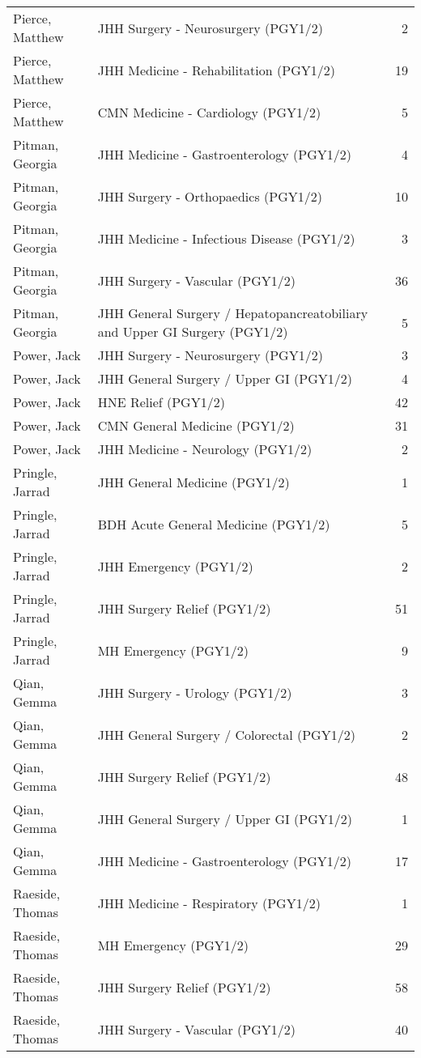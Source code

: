 \documentclass[
]{article}
\begin{document}
\begin{longtable}{llr}
Pierce, Matthew & JHH Surgery - Neurosurgery (PGY1/2) & 2 \\ 
Pierce, Matthew & JHH Medicine - Rehabilitation (PGY1/2) & 19 \\ 
Pierce, Matthew & CMN Medicine - Cardiology (PGY1/2) & 5 \\ 
Pitman, Georgia & JHH Medicine - Gastroenterology (PGY1/2) & 4 \\ 
Pitman, Georgia & JHH Surgery - Orthopaedics (PGY1/2) & 10 \\ 
Pitman, Georgia & JHH Medicine - Infectious Disease (PGY1/2) & 3 \\ 
Pitman, Georgia & JHH Surgery - Vascular (PGY1/2) & 36 \\ 
Pitman, Georgia & JHH General Surgery / Hepatopancreatobiliary and Upper GI Surgery (PGY1/2) & 5 \\ 
Power, Jack & JHH Surgery - Neurosurgery (PGY1/2) & 3 \\ 
Power, Jack & JHH General Surgery / Upper GI (PGY1/2) & 4 \\ 
Power, Jack & HNE Relief (PGY1/2) & 42 \\ 
Power, Jack & CMN General Medicine (PGY1/2) & 31 \\ 
Power, Jack & JHH Medicine - Neurology (PGY1/2) & 2 \\ 
Pringle, Jarrad & JHH General Medicine (PGY1/2) & 1 \\ 
Pringle, Jarrad & BDH Acute General Medicine (PGY1/2) & 5 \\ 
Pringle, Jarrad & JHH Emergency (PGY1/2) & 2 \\ 
Pringle, Jarrad & JHH Surgery Relief (PGY1/2) & 51 \\ 
Pringle, Jarrad & MH Emergency (PGY1/2) & 9 \\ 
Qian, Gemma & JHH Surgery - Urology (PGY1/2) & 3 \\ 
Qian, Gemma & JHH General Surgery / Colorectal (PGY1/2) & 2 \\ 
Qian, Gemma & JHH Surgery Relief (PGY1/2) & 48 \\ 
Qian, Gemma & JHH General Surgery / Upper GI (PGY1/2) & 1 \\ 
Qian, Gemma & JHH Medicine - Gastroenterology (PGY1/2) & 17 \\ 
Raeside, Thomas & JHH Medicine - Respiratory (PGY1/2) & 1 \\ 
Raeside, Thomas & MH Emergency (PGY1/2) & 29 \\ 
Raeside, Thomas & JHH Surgery Relief (PGY1/2) & 58 \\ 
Raeside, Thomas & JHH Surgery - Vascular (PGY1/2) & 40 \\ 

\end{longtable}
\end{document}
